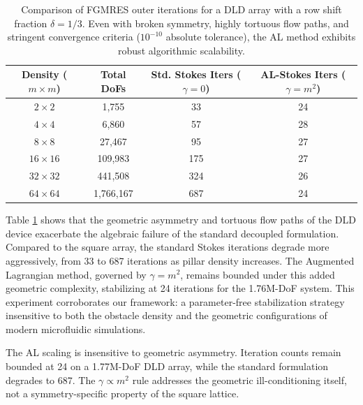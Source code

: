 \documentclass{elsarticle}
\begin{document}
\begin{table}[htbp]
    \centering
    \caption{Comparison of FGMRES outer iterations for a DLD array with a row shift fraction $\delta = 1/3$. Even with broken symmetry, highly tortuous flow paths, and stringent convergence criteria ($10^{-10}$ absolute tolerance), the AL method exhibits robust algorithmic scalability.}
    \label{tab:solver_iterations_dld}
    \begin{tabular}{cccc} %
        \toprule
        Density ($m \times m$) & Total DoFs & Std. Stokes Iters ($\gamma=0$) & AL-Stokes Iters ($\gamma = m^2$) \\
        \midrule
        $2 \times 2$           & 1,755      & 33                             & 24                               \\
        $4 \times 4$           & 6,860      & 57                             & 28                               \\
        $8 \times 8$           & 27,467     & 95                             & 27                               \\
        $16 \times 16$         & 109,983    & 175                            & 27                               \\
        $32 \times 32$         & 441,508    & 324                            & 26                               \\
        $64 \times 64$         & 1,766,167  & 687                            & 24                               \\
        \bottomrule
    \end{tabular}
\end{table}

Table \ref{tab:solver_iterations_dld} shows that the geometric asymmetry and tortuous flow paths of the DLD device exacerbate the algebraic failure of the standard decoupled formulation. Compared to the square array, the standard Stokes iterations degrade more aggressively, from 33 to 687 iterations as pillar density increases. The Augmented Lagrangian method, governed by $\gamma = m^2$, remains bounded under this added geometric complexity, stabilizing at 24 iterations for the 1.76M-DoF system. This experiment corroborates our framework: a parameter-free stabilization strategy insensitive to both the obstacle density and the geometric configurations of modern microfluidic simulations.

The AL scaling is insensitive to geometric asymmetry. Iteration counts remain bounded at 24 on a 1.77M-DoF DLD array, while the standard formulation degrades to 687. The $\gamma \propto m^2$ rule addresses the geometric ill-conditioning itself, not a symmetry-specific property of the square lattice.
\end{document}
